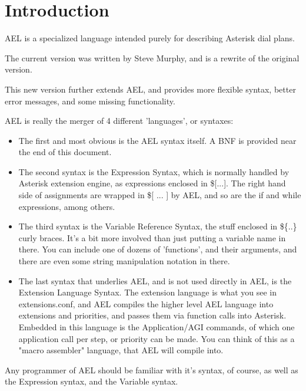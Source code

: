 \section{Introduction}

AEL is a specialized language intended purely for
describing Asterisk dial plans.

The current version was written by Steve Murphy, and is a rewrite of
the original version.

This new version further extends AEL, and
provides more flexible syntax, better error messages, and some missing
functionality.

AEL is really the merger of 4 different 'languages', or syntaxes:

\begin{itemize}
    \item The first and most obvious is the AEL syntax itself. A BNF is
      provided near the end of this document.

    \item The second syntax is the Expression Syntax, which is normally
     handled by Asterisk extension engine, as expressions enclosed in
     \$[...]. The right hand side of assignments are wrapped in \$[ ... ]
     by AEL, and so are the if and while expressions, among others.

    \item The third syntax is the Variable Reference Syntax, the stuff
      enclosed in \$\{..\} curly braces. It's a bit more involved than just
      putting a variable name in there. You can include one of dozens of
      'functions', and their arguments, and there are even some string
      manipulation notation in there.

    \item The last syntax that underlies AEL, and is not used
      directly in AEL, is the Extension Language Syntax. The
      extension language is what you see in extensions.conf, and AEL
      compiles the higher level AEL language into extensions and
      priorities, and passes them via function calls into
      Asterisk. Embedded in this language is the Application/AGI
      commands, of which one application call per step, or priority
      can be made. You can think of this as a "macro assembler"
      language, that AEL will compile into.
\end{itemize}

Any programmer of AEL should be familiar with it's syntax, of course,
as well as the Expression syntax, and the Variable syntax.


